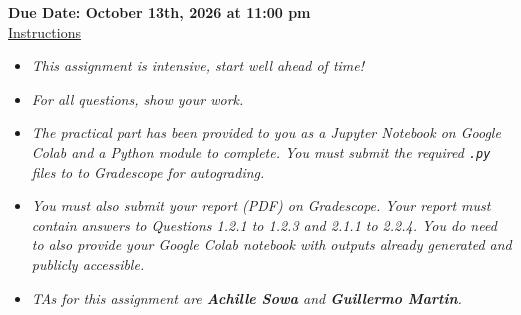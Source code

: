 \documentclass[12pt]{article}
\theoremstyle{definition}
\begin{document}
\fancyhead{}
\fancyfoot{}


\vspace{1cm}

\shorthandoff{:}
{\textbf{Due Date: October 13th, 2026 at 11:00 pm}}\\


\vspace{-0.5cm}
\underline{Instructions}%
\renewcommand{\labelitemi}{\textbullet}

\renewcommand{\labelitemi}{\textbullet}

\begin{itemize}
\item \emph{This assignment is intensive, start well ahead of time!}
\item \emph{For all questions, show your work.}
\item \emph{The practical part has been provided to you as a Jupyter Notebook on Google Colab and a Python module to complete. You must submit the required \texttt{.py} files to  to Gradescope for autograding.}
\item \emph{You must also submit your report (PDF) on Gradescope. Your report must contain answers to Questions 1.2.1 to 1.2.3 and 2.1.1 to 2.2.4. You do need to also provide your Google Colab notebook with outputs already generated and publicly accessible.}
\item \emph{TAs for this assignment are \textbf{Achille Sowa} and \textbf{Guillermo Martin}.}
\end{itemize}
\vspace{0.2cm}


\vspace{0.2cm}
\end{document}

